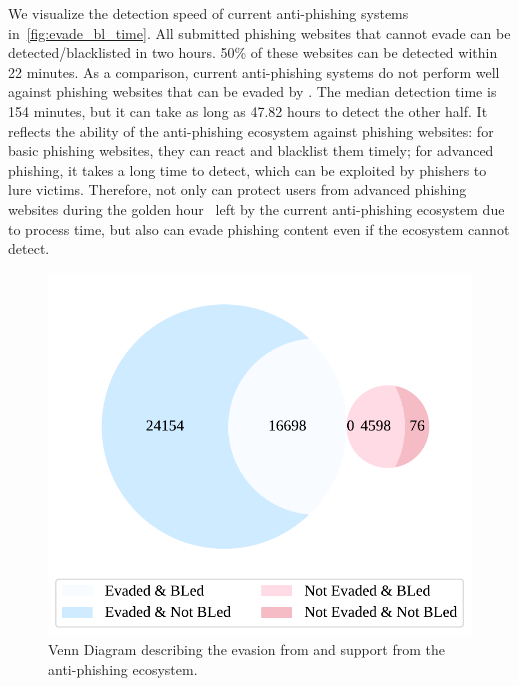 We visualize the detection speed of current anti-phishing systems in~\autoref{fig:evade_bl_time}.
All submitted phishing websites that \spartacus cannot evade can be detected/blacklisted in two hours.
50\% of these websites can be detected within 22 minutes.
As a comparison, current anti-phishing systems do not perform well against phishing websites that can be evaded by \spartacus.
The median detection time is 154 minutes, but it can take as long as 47.82 hours to detect the other half.
It reflects the ability of the anti-phishing ecosystem against phishing websites: 
for basic phishing websites, they can react and blacklist them timely;
for advanced phishing, it takes a long time to detect, which can be exploited by phishers to lure victims.
Therefore, \spartacus not only can protect users from advanced phishing websites during the golden hour~\cite{oest2020sunrise} left by the current anti-phishing ecosystem due to process time, but also can evade phishing content even if the ecosystem cannot detect.


\begin{figure}
\centering
\includegraphics[width=\linewidth]{figs/venn_eval_3_new.pdf}
\caption{Venn Diagram describing the evasion from \spartacus and support from the anti-phishing ecosystem.}
\label{fig:venn_support}
\end{figure}

